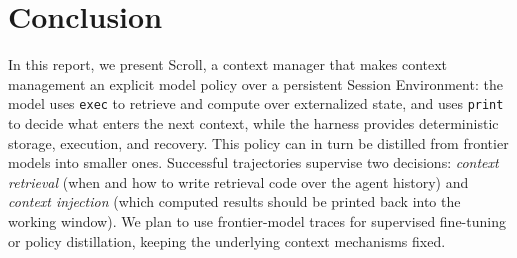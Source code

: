 \section{Conclusion} \label{sec:conclusion} 

In this report, we present Scroll, a context manager that makes context management an explicit model policy over a persistent Session Environment: the model uses \texttt{exec} to retrieve and compute over externalized state, and uses \texttt{print} to decide what enters the next context, while the harness provides deterministic storage, execution, and recovery. This policy can in turn be distilled from frontier models into smaller ones. Successful trajectories supervise two decisions: \emph{context retrieval} (when and how to write retrieval code over the agent history) and \emph{context injection} (which computed results should be printed back into the working window). We plan to use frontier-model traces for supervised fine-tuning or policy distillation, keeping the underlying context mechanisms fixed.